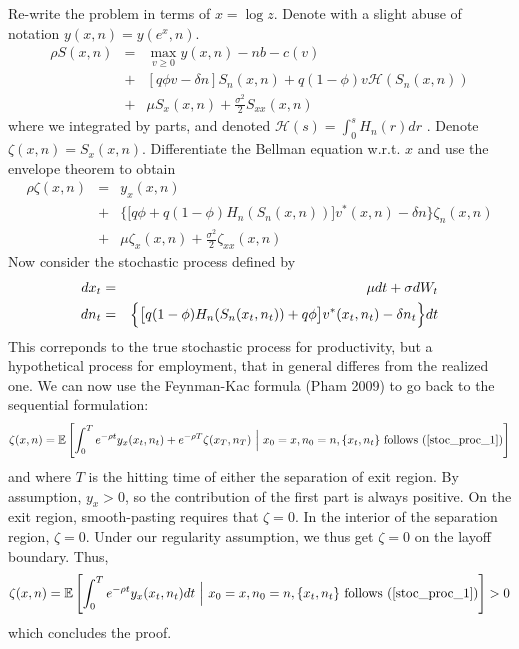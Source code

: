 Re-write the problem in terms of $x = \log z$. Denote with a slight abuse of
notation $y(x,n) = y(e^x,n)$.
\begin{eqnarray*}
\rho S(x,n) &=& \max_{v \geq 0} y(x,n) - n b - c(v) \\
&+& [q \phi v - \delta n] S_n(x,n) + q (1-\phi) v \mathcal{H}(S_n(x,n)) \\
&+& \mu S_x(x,n) + \frac{\sigma^2}{2} S_{xx}(x,n)
\end{eqnarray*}
where we integrated by parts, and denoted $\mathcal{H}(s) = \int_0^s H_n(r)dr$%
. Denote $\zeta(x,n) = S_x(x,n)$. Differentiate the Bellman equation w.r.t. $%
x$ and use the envelope theorem to obtain
\begin{eqnarray*}
\rho \zeta(x,n) &=& y_x(x,n) \\
&+& \Big\{ \big[q \phi+q (1-\phi) H_n(S_n(x,n)) \big] v^*(x,n) - \delta n %
\Big\} \zeta_n(x,n) \\
&+& \mu \zeta_x(x,n) + \frac{\sigma^2}{2} \zeta_{xx}(x,n)
\end{eqnarray*}
Now consider the stochastic process defined by
\begin{eqnarray}  \label{stoc_proc_1}
dx_t &=& \mu dt + \sigma dW_t  \notag \\
dn_t &=& \Big\{ \big[q (1-\phi) H_n(S_n(x_t,n_t)) + q \phi \big] v^*(x_t,n_t)
- \delta n_t \Big\} dt
\end{eqnarray}
This correponds to the true stochastic process for productivity, but a
hypothetical process for employment, that in general differes from the
realized one. We can now use the Feynman-Kac formula (Pham 2009) to go back
to the sequential formulation:
\begin{eqnarray*}
\zeta(x,n) = \mathbb{E} \left[ \int_0^T e^{-\rho t} y_x(x_t,n_t) + e^{-\rho
T} \zeta(x_T,n_T) \ \Big| \ x_0 = x , n_0 = n , \{x_t,n_t\} \text{ follows (%
\ref{stoc_proc_1})} \right]
\end{eqnarray*}
and where $T$ is the hitting time of either the separation of exit region.
By assumption, $y_x > 0$, so the contribution of the first part is always
positive. On the exit region, smooth-pasting requires that $\zeta = 0$.
In the interior of the separation region, $\zeta = 0$. Under our regularity
assumption, we thus get $\zeta = 0$ on the layoff boundary. Thus,
\begin{eqnarray*}
\zeta(x,n) = \mathbb{E} \left[ \int_0^T e^{-\rho t} y_x(x_t,n_t)dt \ \Big| \
x_0 = x , n_0 = n , \{x_t,n_t\} \text{ follows (\ref{stoc_proc_1})} \right]
> 0
\end{eqnarray*}
which concludes the proof.


